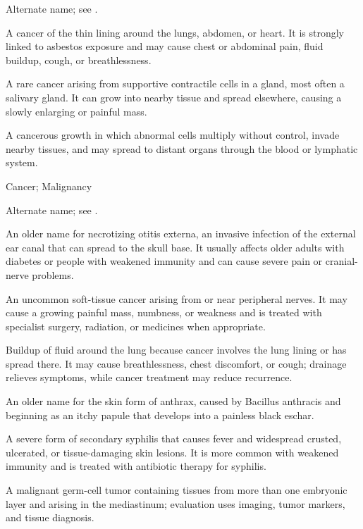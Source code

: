  Alternate name; see .

 A cancer of the thin lining around the lungs, abdomen, or heart. It is strongly linked to asbestos exposure and may cause chest or abdominal pain, fluid buildup, cough, or breathlessness.

 A rare cancer arising from supportive contractile cells in a gland, most often a salivary gland. It can grow into nearby tissue and spread elsewhere, causing a slowly enlarging or painful mass.

 A cancerous growth in which abnormal cells multiply without control, invade nearby tissues, and may spread to distant organs through the blood or lymphatic system.

\synonyms
Cancer; Malignancy

 Alternate name; see .

 An older name for necrotizing otitis externa, an invasive infection of the external ear canal that can spread to the skull base. It usually affects older adults with diabetes or people with weakened immunity and can cause severe pain or cranial-nerve problems.

 An uncommon soft-tissue cancer arising from or near peripheral nerves. It may cause a growing painful mass, numbness, or weakness and is treated with specialist surgery, radiation, or medicines when appropriate.

 Buildup of fluid around the lung because cancer involves the lung lining or has spread there. It may cause breathlessness, chest discomfort, or cough; drainage relieves symptoms, while cancer treatment may reduce recurrence.

 An older name for the skin form of anthrax, caused by Bacillus anthracis and beginning as an itchy papule that develops into a painless black eschar.

 A severe form of secondary syphilis that causes fever and widespread crusted, ulcerated, or tissue-damaging skin lesions. It is more common with weakened immunity and is treated with antibiotic therapy for syphilis.

 A malignant germ-cell tumor containing tissues from more than one embryonic layer and arising in the mediastinum; evaluation uses imaging, tumor markers, and tissue diagnosis.

